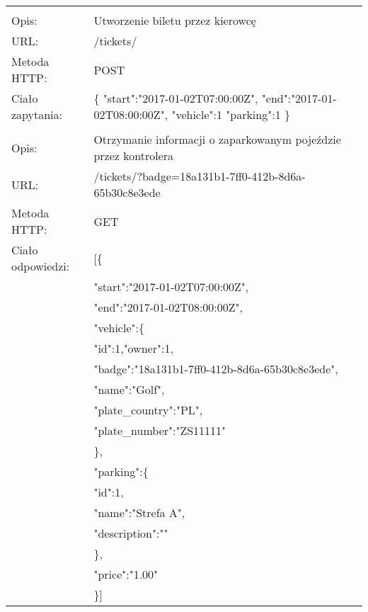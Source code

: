\begin{longtable}{p{3.5cm}  p{11cm}}
	&\\
	
	Opis:&Utworzenie biletu przez kierowcę\\
	URL:&/tickets/\\
	Metoda HTTP:&POST\\
	Ciało zapytania:&\{\newline
	\-\hspace{1cm}"start":"2017-01-02T07:00:00Z",\newline
	\-\hspace{1cm}"end":"2017-01-02T08:00:00Z",\newline
	\-\hspace{1cm}"vehicle":1\newline
	\-\hspace{1cm}"parking":1\newline
	\}\\
	
	&\\
	
	Opis:&Otrzymanie informacji o zaparkowanym pojeździe przez kontrolera\\
	URL:&/tickets/?badge=18a131b1-7ff0-412b-8d6a-65b30c8e3ede\\
	Metoda HTTP:&GET\\
	Ciało odpowiedzi:&[\{\\
	&\-\hspace{1cm}"start":"2017-01-02T07:00:00Z",\\
	&\-\hspace{1cm}"end":"2017-01-02T08:00:00Z",\\
	&\-\hspace{1cm}"vehicle":\{\\
	&\-\hspace{2cm}"id":1,"owner":1,\\
	&\-\hspace{2cm}"badge":"18a131b1-7ff0-412b-8d6a-65b30c8e3ede",\\
	&\-\hspace{2cm}"name":"Golf",\\
	&\-\hspace{2cm}"plate\_country":"PL",\\
	&\-\hspace{2cm}"plate\_number":"ZS11111"\\
	&\},\\
	&\-\hspace{1cm}"parking":\{\\
	&\-\hspace{2cm}"id":1,\\
	&\-\hspace{2cm}"name":"Strefa A",\\
	&\-\hspace{2cm}"description":""\\
	&\-\hspace{2cm}\},\\
	&\-\hspace{1cm}"price":"1.00"\\
	&\}]\\
\end{longtable}
